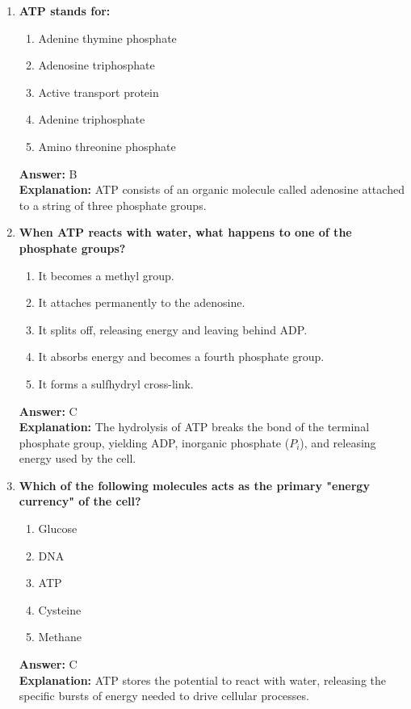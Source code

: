 \documentclass[11pt, a4paper]{article}
\begin{document}
\begin{enumerate}
\item \textbf{ATP stands for:}
\begin{enumerate}[label=\Alph*.]
    \item Adenine thymine phosphate
    \item Adenosine triphosphate
    \item Active transport protein
    \item Adenine triphosphate
    \item Amino threonine phosphate
\end{enumerate}
\textbf{Answer:} B \\
\textbf{Explanation:} ATP consists of an organic molecule called adenosine attached to a string of three phosphate groups.

\item \textbf{When ATP reacts with water, what happens to one of the phosphate groups?}
\begin{enumerate}[label=\Alph*.]
    \item It becomes a methyl group.
    \item It attaches permanently to the adenosine.
    \item It splits off, releasing energy and leaving behind ADP.
    \item It absorbs energy and becomes a fourth phosphate group.
    \item It forms a sulfhydryl cross-link.
\end{enumerate}
\textbf{Answer:} C \\
\textbf{Explanation:} The hydrolysis of ATP breaks the bond of the terminal phosphate group, yielding ADP, inorganic phosphate ($P_i$), and releasing energy used by the cell.

\item \textbf{Which of the following molecules acts as the primary "energy currency" of the cell?}
\begin{enumerate}[label=\Alph*.]
    \item Glucose
    \item DNA
    \item ATP
    \item Cysteine
    \item Methane
\end{enumerate}
\textbf{Answer:} C \\
\textbf{Explanation:} ATP stores the potential to react with water, releasing the specific bursts of energy needed to drive cellular processes.


\end{enumerate}
\end{document}
